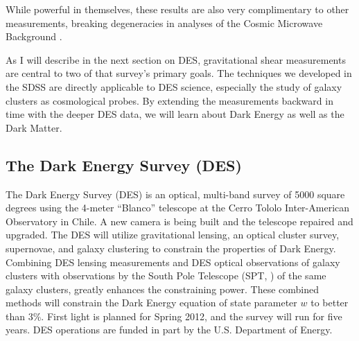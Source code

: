 \documentclass[12pt]{article}
\newcommand{\commissdate}{Spring 2012}
\begin{document}
While powerful in themselves, these results are also very complimentary to
other measurements, breaking degeneracies in analyses of the Cosmic Microwave
Background \cite{KomatsuWMAPCosmo09}. 

As I will describe in the next section on DES, gravitational shear measurements
are central to two of that survey's primary goals.  The techniques we developed
in the SDSS are directly applicable to DES science, especially the study of
galaxy clusters as cosmological probes.  By extending the measurements backward
in time with the deeper DES data, we will learn about Dark Energy as well as
the Dark Matter.

\subsection{The Dark Energy Survey (DES)}

The Dark Energy Survey (DES) is an optical, multi-band survey of 5000 square
degrees using the 4-meter ``Blanco'' telescope at the Cerro Tololo
Inter-American Observatory in Chile. A new camera is being built and the
telescope repaired and upgraded.  The DES will utilize gravitational lensing,
an optical cluster survey, supernovae, and galaxy clustering to constrain the
properties of Dark Energy.  Combining DES lensing measurements and DES optical
observations of galaxy clusters with observations by the South Pole Telescope
(SPT, \cite{SPT04}) of the same galaxy clusters, greatly enhances the
constraining power.  These combined methods will constrain the Dark Energy
equation of state parameter $w$ to better than 3\%.  First light is planned for
\commissdate, and the survey will run for five years.  DES operations are
funded in part by the U.S.  Department of Energy. 
\end{document}
